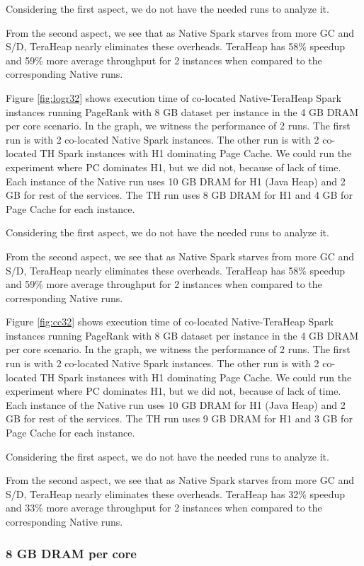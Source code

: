 Considering the first aspect, we do not have the needed runs to analyze it.

From the second aspect, we see that as Native Spark starves from more GC and S/D, TeraHeap nearly eliminates these overheads. TeraHeap has 58\% speedup and 59\% more average throughput for 2 instances when compared to the corresponding Native runs.

Figure \ref{fig:logr32} shows execution time of co-located
Native-TeraHeap Spark instances running PageRank with 8 GB
dataset per instance in the 4 GB DRAM per core scenario.
In the graph, we witness the performance of 2 runs. The first run is with 2 co-located Native Spark instances.
The other run is with 2 co-located TH Spark instances with H1 dominating Page Cache.
We could run the experiment where PC dominates H1, but we did not, because of lack of time.
Each instance of the Native run uses 10 GB DRAM for H1 (Java Heap) and 2 GB for rest of the services.
The TH run uses 8 GB DRAM for H1 and 4 GB for Page Cache for each instance.

Considering the first aspect, we do not have the needed runs to analyze it.

From the second aspect, we see that as Native Spark starves from more GC and S/D, TeraHeap nearly eliminates these overheads. TeraHeap has 58\% speedup and 59\% more average throughput for 2 instances when compared to the corresponding Native runs.

Figure \ref{fig:cc32} shows execution time of co-located
Native-TeraHeap Spark instances running PageRank with 8 GB
dataset per instance in the 4 GB DRAM per core scenario.
In the graph, we witness the performance of 2 runs. The first run is with 2 co-located Native Spark instances.
The other run is with 2 co-located TH Spark instances with H1 dominating Page Cache.
We could run the experiment where PC dominates H1, but we did not, because of lack of time.
Each instance of the Native run uses 10 GB DRAM for H1 (Java Heap) and 2 GB for rest of the services.
The TH run uses 9 GB DRAM for H1 and 3 GB for Page Cache for each instance.

Considering the first aspect, we do not have the needed runs to analyze it.

From the second aspect, we see that as Native Spark starves from more GC and S/D, TeraHeap nearly eliminates these overheads. TeraHeap has 32\% speedup and 33\% more average throughput for 2 instances when compared to the corresponding Native runs.

\subsubsection{8 GB DRAM per core}

